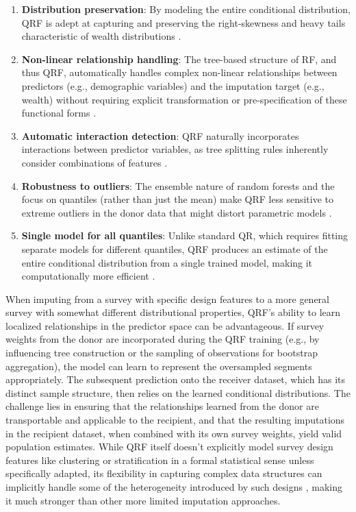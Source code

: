\begin{enumerate}
    \item \textbf{Distribution preservation}: By modeling the entire conditional distribution, QRF is adept at capturing and preserving the right-skewness and heavy tails characteristic of wealth distributions \citep{meinshausen2006quantile}. 

    \item \textbf{Non-linear relationship handling}: The tree-based structure of RF, and thus QRF, automatically handles complex non-linear relationships between predictors (e.g., demographic variables) and the imputation target (e.g., wealth) without requiring explicit transformation or pre-specification of these functional forms \citep{tang2017random}.

    \item \textbf{Automatic interaction detection}: QRF naturally incorporates interactions between predictor variables, as tree splitting rules inherently consider combinations of features \citep{tang2017random}.

    \item \textbf{Robustness to outliers}:  The ensemble nature of random forests and the focus on quantiles (rather than just the mean) make QRF less sensitive to extreme outliers in the donor data that might distort parametric models \citep{learneconometricsfast2025quantile}.

    \item \textbf{Single model for all quantiles}: Unlike standard QR, which requires fitting separate models for different quantiles, QRF produces an estimate of the entire conditional distribution from a single trained model, making it computationally more efficient \citep{meinshausen2006quantile}.
\end{enumerate}

When imputing from a survey with specific design features to a more general survey with somewhat different distributional properties, QRF's ability to learn localized relationships in the predictor space can be advantageous. If survey weights from the donor are incorporated during the QRF training (e.g., by influencing tree construction or the sampling of observations for bootstrap aggregation), the model can learn to represent the oversampled segments appropriately. The subsequent prediction onto the receiver dataset, which has its distinct sample structure, then relies on the learned conditional distributions. The challenge lies in ensuring that the relationships learned from the donor are transportable and applicable to the recipient, and that the resulting imputations in the recipient dataset, when combined with its own survey weights, yield valid population estimates. While QRF itself doesn't explicitly model survey design features like clustering or stratification in a formal statistical sense unless specifically adapted, its flexibility in capturing complex data structures can implicitly handle some of the heterogeneity introduced by such designs \citep{hao2007quantile}, making it much stronger than other more limited imputation approaches.

